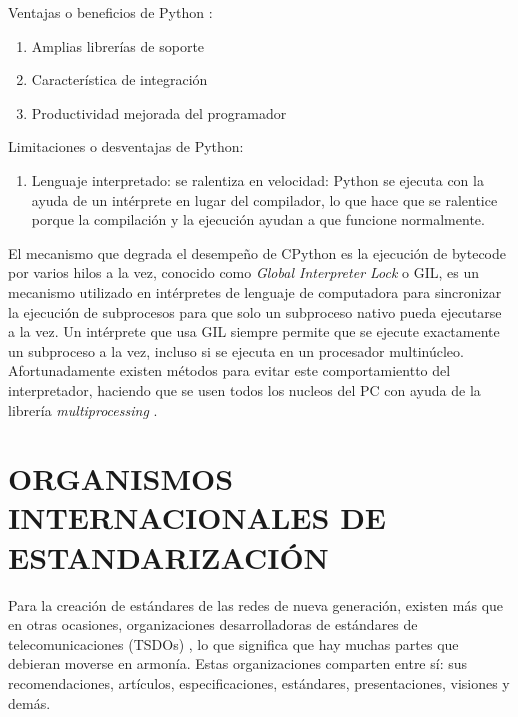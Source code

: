 Ventajas o beneficios de Python \parencite{PythonVentajas}:
\begin{enumerate}
\item  Amplias librerías de soporte
\item  Característica de integración
\item  Productividad mejorada del programador
\end{enumerate}

Limitaciones o desventajas de Python:
\begin{enumerate}
\item  Lenguaje interpretado: se ralentiza en velocidad: Python se ejecuta con la ayuda de un intérprete en lugar del compilador, lo que hace que se ralentice porque la compilación y la ejecución ayudan a que funcione normalmente.
\end{enumerate}

El mecanismo que degrada el desempeño de CPython es la ejecución de bytecode por varios hilos a la vez, conocido como \textit{Global Interpreter Lock} o GIL, es un mecanismo utilizado en intérpretes de lenguaje de computadora para sincronizar la ejecución de subprocesos para que solo un subproceso nativo pueda ejecutarse a la vez. Un intérprete que usa GIL siempre permite que se ejecute exactamente un subproceso a la vez, incluso si se ejecuta en un procesador multinúcleo.\newline
Afortunadamente existen métodos para evitar este comportamientto del interpretador, haciendo que se usen todos los nucleos del PC con ayuda de la librería \textit{multiprocessing} \parencite{Multiprocessing}.



\section{ORGANISMOS INTERNACIONALES DE ESTANDARIZACIÓN}

Para la creación de estándares de las redes de nueva generación, existen más que en otras ocasiones, organizaciones desarrolladoras de estándares de telecomunicaciones (TSDOs) \parencite{3GPP2019}, lo que significa que hay muchas partes que debieran moverse en armonía. Estas organizaciones comparten entre sí: sus recomendaciones, artículos, especificaciones, estándares, presentaciones, visiones y demás. \newline

